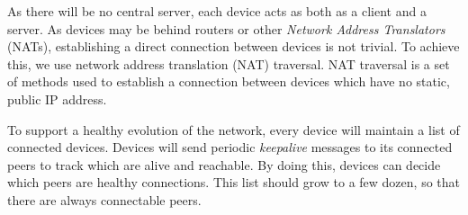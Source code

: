 As there will be no central server, each device acts as both as a client and a server. As devices may be behind routers or other \textit{Network Address Translators} (NATs), establishing a direct connection between devices is not trivial. To achieve this, we use network address translation (NAT) traversal. NAT traversal is a set of methods used to establish a connection between devices which have no static, public IP address.

To support a healthy evolution of the network, every device will maintain a list of connected devices. Devices will send periodic \textit{keepalive} messages to its connected peers to track which are alive and reachable. By doing this, devices can decide which peers are healthy connections. This list should grow to a few dozen, so that there are always connectable peers.






